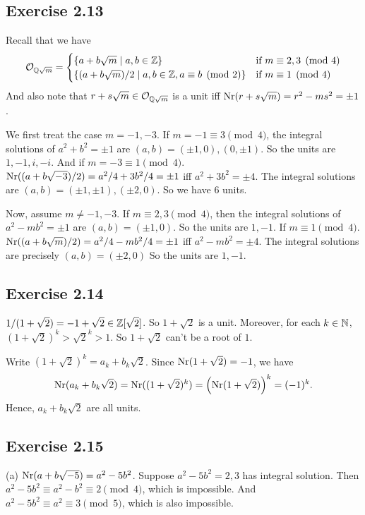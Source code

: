 \documentclass[../Marcus.tex]{subfiles}
\begin{document}
\subsection*{Exercise 2.13}

Recall that we have
$$
\mathcal{O}_{\mathbb{Q}\sqrt{m}}=
\begin{cases}
    \{ a+b\sqrt{m}\mid a,b\in\mathbb{Z} \} & \text{if } m \equiv 2,3 \pmod{4}\\
    \{ (a+b\sqrt{m})/2 \mid a,b\in\mathbb{Z},a \equiv b \pmod{2} \} & \text{if } m \equiv 1 \pmod{4}
\end{cases}
$$
And also note that $r+s\sqrt{m}\in \mathcal{O}_{\mathbb{Q}\sqrt{m}}$ is a unit iff $\operatorname{Nr}(r+s\sqrt{m})=r^2-ms^2=\pm1$.

We first treat the case $m=-1,-3$. If $m=-1 \equiv 3 \pmod{4}$, the integral solutions of $a^2+b^2=\pm1$ are $(a,b)=(\pm1,0),(0,\pm1)$. So the units are $1,-1,i,-i$. And if $m=-3 \equiv 1 \pmod{4}$. $\operatorname{Nr}((a+b\sqrt{-3})/2)=a^2/4+3b^2/4=\pm1$ iff $a^2+3b^2=\pm4$. The integral solutions are $(a,b)=(\pm1,\pm1),(\pm2,0)$. So we have 6 units.

Now, assume $m\neq-1,-3$. If $m \equiv 2,3 \pmod{4}$, then the integral solutions of $a^2-mb^2=\pm1$ are $(a,b)=(\pm1,0)$. So the units are $1,-1$. If $m \equiv 1 \pmod{4}$. $\operatorname{Nr}((a+b\sqrt{m})/2)=a^2/4-mb^2/4=\pm1$ iff $a^2-mb^2=\pm4$. The integral solutions are precisely $(a,b)=(\pm2,0)$ So the units are $1,-1$.

\subsection*{Exercise 2.14}

$1/(1+\sqrt{2})=-1+\sqrt{2}\in \mathbb{Z}[\sqrt{2}]$. So $1+\sqrt{2}$ is a unit. Moreover, for each $k\in\mathbb{N}$, $(1+\sqrt{2})^k>\sqrt{2}^k>1$. So $1+\sqrt{2}$ can't be a root of $1$.

Write $(1+\sqrt{2})^k=a_k+b_k\sqrt{2}$. Since $\operatorname{Nr}(1+\sqrt{2})=-1$, we have $$\operatorname{Nr}(a_k+b_k\sqrt{2})=\operatorname{Nr}((1+\sqrt{2})^k)=\left(\operatorname{Nr}(1+\sqrt{2})\right)^k=(-1)^k.$$ Hence, $a_k+b_k\sqrt{2}$ are all units.

\subsection*{Exercise 2.15}

(a) $\operatorname{Nr}(a+b\sqrt{-5})=a^2-5b^2$. Suppose $a^2-5b^2=2,3$ has integral solution. Then $a^2-5b^2 \equiv a^2-b^2 \equiv 2 \pmod{4}$, which is impossible. And $a^2-5b^2 \equiv a^2 \equiv 3 \pmod{5}$, which is also impossible.
\end{document}
